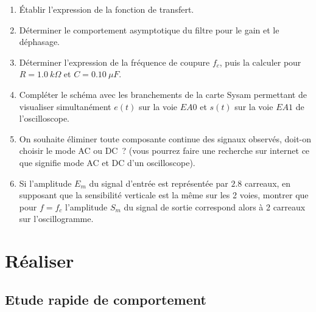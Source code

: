 \documentclass[a4paper, 11pt, final, garamond]{book}
\begin{document}
\begin{enumerate}[label=\sqenumi]
    \item Établir l'expression de la fonction de transfert.
    \item Déterminer le comportement asymptotique du filtre pour le gain et le
        déphasage.
    \item Déterminer l'expression de la fréquence de coupure $f_{c}$, puis la
        calculer pour $R=\SI{1,0}{k\Omega}$ et $C = \SI{0,10}{\mu F}$.

    \item Compléter le schéma avec les branchements de la carte Sysam permettant
        de visualiser simultanément $e(t)$ sur la voie $EA0$ et $s(t)$ sur la
        voie $EA1$ de l'oscilloscope.

    \item On souhaite éliminer toute composante continue des signaux observés,
        doit-on choisir le mode AC ou DC~? (vous pourrez faire une recherche sur
        internet ce que signifie mode AC et DC d'un oscilloscope).

    \item Si l'amplitude $E_{m}$ du signal d'entrée est représentée par
        $\num{2,8}$ carreaux, en supposant que la sensibilité verticale est la
        même sur les 2 voies, montrer que pour $f=f_{c}$ l'amplitude $S_{m}$ du
        signal de sortie correspond alors à 2 carreaux sur l'oscillogramme.
\end{enumerate}

\section{Réaliser}

\subsection{Etude rapide de comportement}
\end{document}
